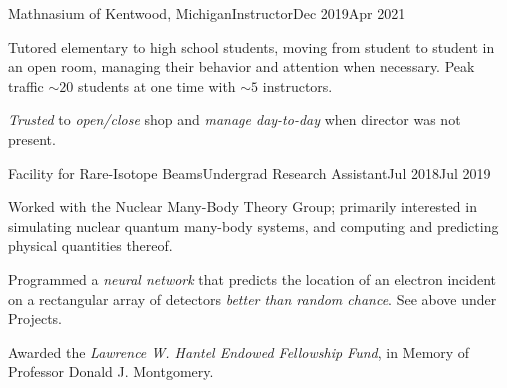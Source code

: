 \begin{job}{Mathnasium of Kentwood, Michigan}{Instructor}{Dec 2019}{Apr 2021}
    \item Tutored elementary to high school students,
        moving from student to student in an open room,
        managing their behavior and attention when necessary.
    Peak traffic ${\sim}20$ students at one time with ${\sim}5$ instructors.
    \item \emph{Trusted} to \emph{open/close} shop
        and \emph{manage day-to-day} when director was not present.
\end{job}

\begin{job}{Facility for Rare-Isotope Beams}{Undergrad Research Assistant}{Jul 2018}{Jul 2019}
    \item Worked with the Nuclear Many-Body Theory Group;
        primarily interested in simulating nuclear quantum many-body systems,
        and computing and predicting physical quantities thereof.
    \item Programmed a \emph{neural network}
        that predicts the location of an electron incident on a rectangular
        array of detectors \emph{better than random chance}. See
         above under Projects.
    \item Awarded the \emph{Lawrence W. Hantel Endowed Fellowship Fund},
        in Memory of Professor Donald J. Montgomery.
\end{job}

